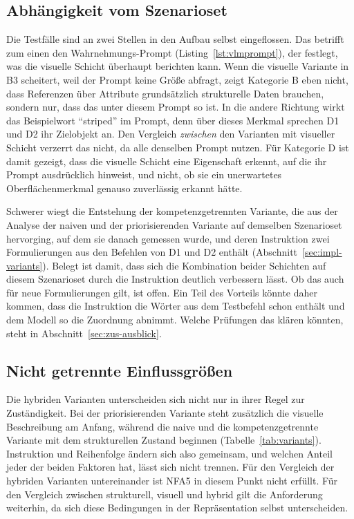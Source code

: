 \subsection*{Abhängigkeit vom Szenarioset}

Die Testfälle sind an zwei Stellen in den Aufbau selbst eingeflossen.
Das betrifft zum einen den Wahrnehmungs-Prompt (Listing~\ref{lst:vlmprompt}), der festlegt, was die visuelle Schicht überhaupt berichten kann.
Wenn die visuelle Variante in B3 scheitert, weil der Prompt keine Größe abfragt, zeigt Kategorie B eben nicht, dass Referenzen über Attribute grundsätzlich strukturelle Daten brauchen, sondern nur, dass das unter diesem Prompt so ist.
In die andere Richtung wirkt das Beispielwort \enquote{striped} im Prompt, denn über dieses Merkmal sprechen D1 und D2 ihr Zielobjekt an.
Den Vergleich \emph{zwischen} den Varianten mit visueller Schicht verzerrt das nicht, da alle denselben Prompt nutzen.
Für Kategorie D ist damit gezeigt, dass die visuelle Schicht eine Eigenschaft erkennt, auf die ihr Prompt ausdrücklich hinweist, und nicht, ob sie ein unerwartetes Oberflächenmerkmal genauso zuverlässig erkannt hätte.

Schwerer wiegt die Entstehung der kompetenzgetrennten Variante, die aus der Analyse der naiven und der priorisierenden Variante auf demselben Szenarioset hervorging, auf dem sie danach gemessen wurde, und deren Instruktion zwei Formulierungen aus den Befehlen von D1 und D2 enthält (Abschnitt~\ref{sec:impl-variants}).
Belegt ist damit, dass sich die Kombination beider Schichten auf diesem Szenarioset durch die Instruktion deutlich verbessern lässt.
Ob das auch für neue Formulierungen gilt, ist offen.
Ein Teil des Vorteils könnte daher kommen, dass die Instruktion die Wörter aus dem Testbefehl schon enthält und dem Modell so die Zuordnung abnimmt.
Welche Prüfungen das klären könnten, steht in Abschnitt~\ref{sec:zus-ausblick}.

\subsection*{Nicht getrennte Einflussgrößen}

Die hybriden Varianten unterscheiden sich nicht nur in ihrer Regel zur Zuständigkeit.
Bei der priorisierenden Variante steht zusätzlich die visuelle Beschreibung am Anfang, während die naive und die kompetenzgetrennte Variante mit dem strukturellen Zustand beginnen (Tabelle~\ref{tab:variants}).
Instruktion und Reihenfolge ändern sich also gemeinsam, und welchen Anteil jeder der beiden Faktoren hat, lässt sich nicht trennen.
Für den Vergleich der hybriden Varianten untereinander ist NFA5 in diesem Punkt nicht erfüllt.
Für den Vergleich zwischen strukturell, visuell und hybrid gilt die Anforderung weiterhin, da sich diese Bedingungen in der Repräsentation selbst unterscheiden.


